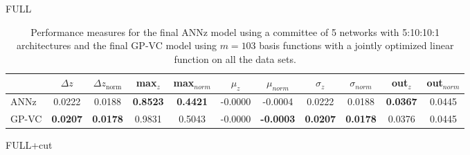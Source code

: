 \documentclass[useAMS,usenatbib,fleqn]{mn2e}
\begin{document}
\begin{center}
\begin{table}
\begin{subtable}{\textwidth}
\caption{FULL}
\label{table-final-results-boss}
\end{subtable}

\begin{subtable}{\textwidth}
\centering

\begin{tabular}{| l | c | c |  c | c |  c | c |  c | c |  c | c | }
     				&	$\Delta z$	&	$\Delta z_\textrm{norm}$	&	max$_{z}$ & max$_{norm}$		&	$\mu_{z}$&	$\mu_{norm}$	& $\sigma_{z}$ & $\sigma_{norm}$ & out$_{z}$&out$_{norm}$\\	\hline
	{\sc ANNz}		&	0.0222	&	0.0188		&	\textbf{0.8523}		&	\textbf{0.4421}&	-0.0000		&	-0.0004 &	0.0222		&	0.0188&	\textbf{0.0367}		&	0.0445\\
	{\sc GP-VC } 	&	\textbf{0.0207} 	&	\textbf{0.0178}		&	0.9831	&	0.5043 & -0.0000		&	\textbf{-0.0003}&	\textbf{0.0207}		&	\textbf{0.0178}&	0.0376 	&	0.0445\\\hline
  \end{tabular}

\caption{FULL+cut}
\label{table-final-results-boss-cut}
\end{subtable}


\caption{Performance measures for the final {\sc ANNz} model using a committee of 5 networks with 5:10:10:1 architectures and the final GP-VC model using $m=103$ basis functions with a jointly optimized linear function on all the data sets.}
\label{table-final-results}
\end{table}
\end{center}
\end{document}
